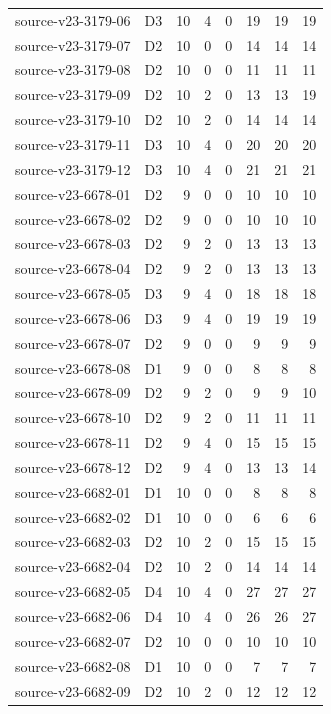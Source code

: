 \begin{longtable}{p{}lrrrrrr}
source-v23-3179-06 & D3 & 10 & 4 & 0 & 19 & 19 & 19\\
source-v23-3179-07 & D2 & 10 & 0 & 0 & 14 & 14 & 14\\
source-v23-3179-08 & D2 & 10 & 0 & 0 & 11 & 11 & 11\\
source-v23-3179-09 & D2 & 10 & 2 & 0 & 13 & 13 & 19\\
source-v23-3179-10 & D2 & 10 & 2 & 0 & 14 & 14 & 14\\
source-v23-3179-11 & D3 & 10 & 4 & 0 & 20 & 20 & 20\\
source-v23-3179-12 & D3 & 10 & 4 & 0 & 21 & 21 & 21\\
source-v23-6678-01 & D2 & 9 & 0 & 0 & 10 & 10 & 10\\
source-v23-6678-02 & D2 & 9 & 0 & 0 & 10 & 10 & 10\\
source-v23-6678-03 & D2 & 9 & 2 & 0 & 13 & 13 & 13\\
source-v23-6678-04 & D2 & 9 & 2 & 0 & 13 & 13 & 13\\
source-v23-6678-05 & D3 & 9 & 4 & 0 & 18 & 18 & 18\\
source-v23-6678-06 & D3 & 9 & 4 & 0 & 19 & 19 & 19\\
source-v23-6678-07 & D2 & 9 & 0 & 0 & 9 & 9 & 9\\
source-v23-6678-08 & D1 & 9 & 0 & 0 & 8 & 8 & 8\\
source-v23-6678-09 & D2 & 9 & 2 & 0 & 9 & 9 & 10\\
source-v23-6678-10 & D2 & 9 & 2 & 0 & 11 & 11 & 11\\
source-v23-6678-11 & D2 & 9 & 4 & 0 & 15 & 15 & 15\\
source-v23-6678-12 & D2 & 9 & 4 & 0 & 13 & 13 & 14\\
source-v23-6682-01 & D1 & 10 & 0 & 0 & 8 & 8 & 8\\
source-v23-6682-02 & D1 & 10 & 0 & 0 & 6 & 6 & 6\\
source-v23-6682-03 & D2 & 10 & 2 & 0 & 15 & 15 & 15\\
source-v23-6682-04 & D2 & 10 & 2 & 0 & 14 & 14 & 14\\
source-v23-6682-05 & D4 & 10 & 4 & 0 & 27 & 27 & 27\\
source-v23-6682-06 & D4 & 10 & 4 & 0 & 26 & 26 & 27\\
source-v23-6682-07 & D2 & 10 & 0 & 0 & 10 & 10 & 10\\
source-v23-6682-08 & D1 & 10 & 0 & 0 & 7 & 7 & 7\\
source-v23-6682-09 & D2 & 10 & 2 & 0 & 12 & 12 & 12\\

\end{longtable}
